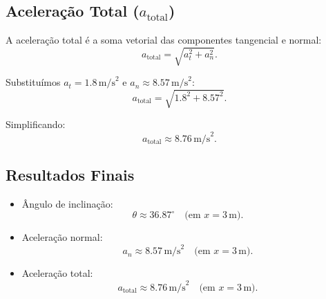 \subsection*{Aceleração Total (\(a_{\text{total}}\))}
A aceleração total é a soma vetorial das componentes tangencial e normal:
\[
a_{\text{total}} = \sqrt{a_t^2 + a_n^2}.
\]

Substituímos \(a_t = 1.8 \, \text{m/s}^2\) e \(a_n \approx 8.57 \, \text{m/s}^2\):
\[
a_{\text{total}} = \sqrt{1.8^2 + 8.57^2}.
\]

Simplificando:
\[
a_{\text{total}} \approx 8.76 \, \text{m/s}^2.
\]

\subsection*{Resultados Finais}
\begin{itemize}
    \item Ângulo de inclinação:
    \[
    \theta \approx 36.87^\circ \quad \text{(em \(x = 3 \, \text{m}\))}.
    \]
    \item Aceleração normal:
    \[
    a_n \approx 8.57 \, \text{m/s}^2 \quad \text{(em \(x = 3 \, \text{m}\))}.
    \]
    \item Aceleração total:
    \[
    a_{\text{total}} \approx 8.76 \, \text{m/s}^2 \quad \text{(em \(x = 3 \, \text{m}\))}.
    \]
\end{itemize}
